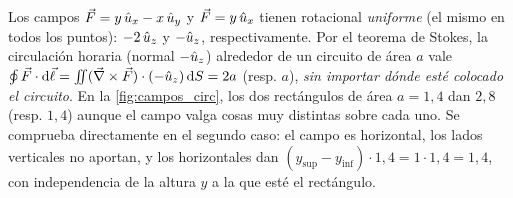 

\begin{ejemplo}\label{ej:rot-uniforme}
Los campos $\vec{F}=y\,\hat{u}_{x}-x\,\hat{u}_{y}$ y $\vec{F}=y\,\hat{u}_{x}$ tienen rotacional
\emph{uniforme} (el mismo en todos los puntos): $-2\,\hat{u}_{z}$ y $-\hat{u}_{z}$,
respectivamente. Por el teorema de Stokes, la circulación horaria (normal $-\hat{u}_{z}$)
alrededor de un circuito de área $a$ vale $\oint\vec{F}\cdot\mathrm{d}\vec{\ell}=\iint(\vec{\nabla}\times\vec{F})\cdot(-\hat{u}_{z})\,\mathrm{d} S=2a$
(resp. $a$), \emph{sin importar dónde esté colocado el circuito}. En la
\cref{fig:campos_circ}, los dos rectángulos de área $a=1{,}4$ dan $2{,}8$ (resp.
$1{,}4$) aunque el campo valga cosas muy distintas sobre cada uno. Se comprueba
directamente en el segundo caso: el campo es horizontal, los lados verticales
no aportan, y los horizontales dan $(y_{\mathrm{sup}}-y_{\mathrm{inf}})\cdot1{,}4=1\cdot1{,}4=1{,}4$,
con independencia de la altura $y$ a la que esté el rectángulo.
\end{ejemplo}



